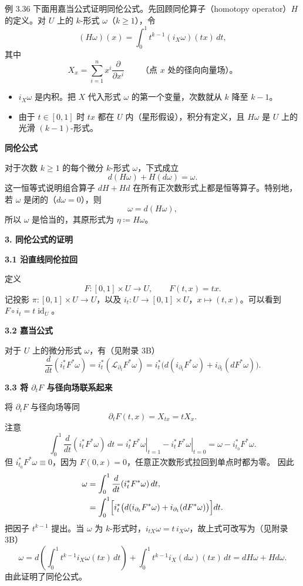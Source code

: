 \begin{statement}{例 3.36}{}
下面用嘉当公式证明同伦公式。先回顾同伦算子（homotopy operator）$H$ 的定义。对 $U$ 上的 $k$-形式 $\omega$（$k\geq1$），令
\[
  (H\omega)(x)=\int_0^1 t^{k-1}(i_X\omega)(tx)\,dt,
\]
其中
\[
  X_x=\sum_{i=1}^n x^i\frac{\partial}{\partial x^i}
   \qquad\text{（点 $x$ 处的径向向量场）。}
\]
\begin{itemize}
\item $i_X\omega$ 是内积。把 $X$ 代入形式 $\omega$ 的第一个变量，次数就从 $k$ 降至 $k-1$。
\item 由于 $t\in[0,1]$ 时 $tx$ 都在 $U$ 内（星形假设），积分有定义，且 $H\omega$ 是 $U$ 上的光滑 $(k-1)$-形式。
\end{itemize}

\noindent\textbf{同伦公式}\par
对于次数 $k\geq1$ 的每个微分 $k$-形式 $\omega$，下式成立
\[
  d(H\omega)+H(d\omega)=\omega.
\]
这一恒等式说明组合算子 $dH+Hd$ 在所有正次数形式上都是恒等算子。特别地，若 $\omega$ 是闭的（$d\omega=0$），则
\[
  \omega=d(H\omega),
\]
所以 $\omega$ 是恰当的，其原形式为 $\eta\coloneqq H\omega$。

\noindent\textbf{3. 同伦公式的证明}\par
\noindent\textbf{3.1 沿直线同伦拉回}\par
定义
\[
  F\colon[0,1]\times U\to U,\qquad F(t,x)=tx.
\]
记投影 $\pi\colon[0,1]\times U\to U$，以及 $i_t\colon U\to[0,1]\times U$，$x\mapsto(t,x)$。可以看到 $F\circ i_t=t\operatorname{id}_U$。

\noindent\textbf{3.2 嘉当公式}\par
对于 $U$ 上的微分形式 $\omega$，有（见附录 3B）
\[
  \frac{d}{dt}(i_t^*F^*\omega)=i_t^*(\mathcal L_{\partial_t}F^*\omega)
  =i_t^*\bigl(d(i_{\partial_t}F^*\omega)+i_{\partial_t}(dF^*\omega)\bigr).
\]

\noindent\textbf{3.3 将 $\partial_tF$ 与径向场联系起来}\par
将 $\partial_tF$ 与径向场等同%
%
\[
  \partial_tF(t,x)=X_{tx}=tX_x.
\]
注意
\[
  \int_0^1\frac{d}{dt}(i_t^*F^*\omega)\,dt
    =\left.i_t^*F^*\omega\right|_{t=1}-\left.i_t^*F^*\omega\right|_{t=0}
    =\omega-i_{t_0}^*F^*\omega.
\]
但 $i_{t_0}^*F^*\omega\equiv0$，因为 $F(0,x)=0$，任意正次数形式拉回到单点时都为零。
因此
\begin{align*}
  \omega&=\int_0^1\frac{d}{dt}(i_t^*F^*\omega)\,dt,\\
   &=\int_0^1\Bigl[i_t^*\bigl(d(i_{\partial_t}F^*\omega)+i_{\partial_t}(dF^*\omega)\bigr)\Bigr]dt.
\end{align*}
把因子 $t^{k-1}$ 提出。当 $\omega$ 为 $k$-形式时，$i_{tX}\omega=t\,i_X\omega$，故上式可改写为（见附录 3B）%
%
\[
  \omega=d\left(\int_0^1 t^{k-1}i_X\omega(tx)\,dt\right)
     +\int_0^1 t^{k-1}i_X(d\omega)(tx)\,dt=dH\omega+Hd\omega.
\]
由此证明了同伦公式。
\end{statement}
